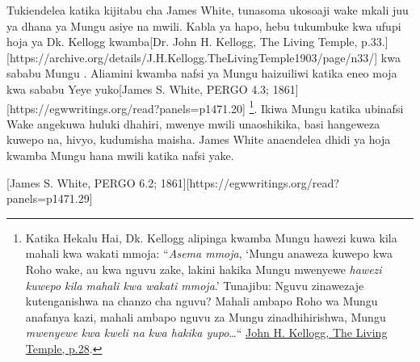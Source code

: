 Tukiendelea katika kijitabu cha James White, tunasoma ukosoaji wake mkali juu ya dhana ya Mungu asiye na mwili. Kabla ya hapo, hebu tukumbuke kwa ufupi hoja ya Dk. Kellogg kwamba[Dr. John H. Kellogg, The Living Temple, p.33.][https://archive.org/details/J.H.Kellogg.TheLivingTemple1903/page/n33/] kwa sababu Mungu . Aliamini kwamba nafsi ya Mungu haizuiliwi katika eneo moja kwa sababu Yeye yuko[James S. White, PERGO 4.3; 1861][https://egwwritings.org/read?panels=p1471.20] \footnote{Katika Hekalu Hai, Dk. Kellogg alipinga kwamba Mungu hawezi kuwa kila mahali kwa wakati mmoja: “\textit{Asema mmoja}, ‘Mungu anaweza kuwepo kwa Roho wake, au kwa nguvu zake, lakini hakika Mungu mwenyewe \textit{hawezi kuwepo kila mahali kwa wakati mmoja}.’ Tunajibu: Nguvu zinawezaje kutenganishwa na chanzo cha nguvu? Mahali ambapo Roho wa Mungu anafanya kazi, mahali ambapo nguvu za Mungu zinadhihirishwa, Mungu \textit{mwenyewe kwa kweli na kwa hakika yupo}…“ \href{https://archive.org/details/J.H.Kellogg.TheLivingTemple1903/page/n29/}{John H. Kellogg, The Living Temple, p.28}.}. Ikiwa Mungu katika ubinafsi Wake angekuwa huluki dhahiri, mwenye mwili unaoshikika, basi hangeweza kuwepo na, hivyo, kudumisha maisha. James White anaendelea dhidi ya hoja kwamba Mungu hana mwili katika nafsi yake.






[James S. White, PERGO 6.2; 1861][https://egwwritings.org/read?panels=p1471.29]


